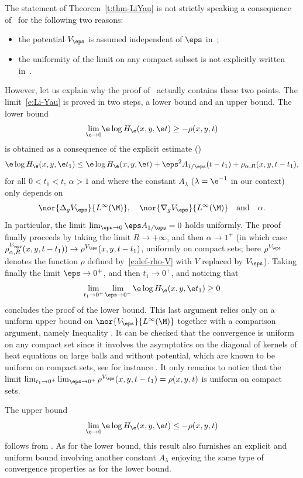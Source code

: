 The statement of Theorem~\ref{t:thm-LiYau} is not strictly speaking a consequence of~\cite[Th.\,6.1]{LY86} for the following two reasons:
\begin{itemize}
\item the potential $V_\eps$ is assumed independent of $\eps$ in~\cite{LY86};
\item the uniformity of the limit on any compact subset is not explicitly written in~\cite{LY86}.
\end{itemize}
However, let us explain why the proof of~\cite[Th.\,6.1]{LY86} actually contains these two points.
The limit~\eqref{e:Li-Yau} is proved in two steps, a lower bound and an upper bound.
The lower bound
\[
\underset{\e\to 0}{\lim}\e \log H_{\e}(x,y,\e t) \geq -\rho(x,y,t)
\]
is obtained as a consequence of the explicit estimate (\cite[Th.\,2.1]{LY86})
\[
\e \log H_{\e}(x,y,\e t_1) \leq \e \log H_{\e}(x,y,\e t)
+ \eps^2 A_{1/\eps} (t-t_1) + \rho_{\alpha,R}(x,y,t-t_1),
\]
for all $0<t_1<t$, $\alpha>1$ and
where the constant $A_{\lambda}$ ($\lambda=\e^{-1}$ in our context) only depends on
\[
\nor{\Delta_g V_\eps}{L^\infty(\M)},\quad \nor{\nabla_g V_\eps}{L^\infty(\M)}\quad\text{and}\quad\alpha.
\]
In particular, the limit $\lim_{\eps\to 0} \eps A_{1/\eps} = 0$ holds uniformly.
The proof finally proceeds by taking the limit $R\to + \infty$, and then $\alpha \to 1^+$ (in which case $\rho^{V_\eps}_{\alpha,R}(x,y,t-t_1)) \to \rho^{V_\eps}(x,y,t-t_1)$, uniformly on compact sets; here $\rho^{V_\eps}$ denotes the function $\rho$ defined by~\eqref{e:def-rho-V} with $V$ replaced by $V_\eps$). Taking finally the limit $\eps \to 0^+$, and then $t_1 \to 0^+$, and noticing that\enlargethispage{-\baselineskip}
\[
\lim_{t_1\to 0^+}\lim_{\eps \to 0^+} \e \log H_{\e}(x,y,\e t_1) \geq 0
\]
concludes the proof of the lower bound.
This last argument relies only on a uniform upper bound on $\nor{V_\eps}{L^\infty(\M)}$ together with a comparison argument, namely Inequa\-lity \cite[(6.3)]{LY86}. It can be checked that the convergence is uniform on any compact set since it involves the asymptotics on the diagonal of kernels of heat equations on large balls and without potential, which are known to be uniform on compact sets, see for instance \cite[Th.\,4.6]{Va:67b}.
It only remains to notice that the limit $\lim_{t_1\to 0^+} \lim_{\eps \to 0^+} \rho^{V_\eps}(x,y,t-t_1) = \rho(x,y, t)$ is uniform on compact sets.

The upper bound
\[
\underset{\e\to 0}{\lim}\e \log H_{\e}(x,y,\e t) \leq -\rho(x,y,t)
\]
follows from \cite[Th.\,3.3]{LY86}. As for the lower bound, this result also furnishes an explicit and uniform bound involving another constant $A_{\lambda}$ enjoying the same type of convergence properties as for the lower bound.

